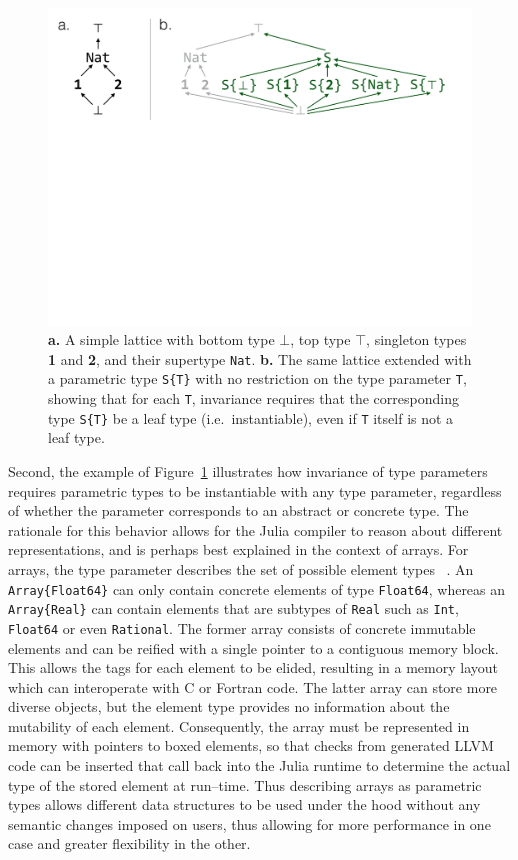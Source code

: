 \documentclass[pldi]{sigplanconf-pldi15}
\begin{document}
\begin{figure}
	\centering
	\includegraphics[width=\columnwidth]{fig-lattice}
	\caption{
		\textbf{a.} A simple lattice with bottom type $\bot$, top type
		$\top$, singleton types \textbf{1} and \textbf{2}, and their
		supertype \texttt{Nat}.
		\textbf{b.} The same lattice extended with a parametric type
		\texttt{S\{T\}} with no restriction on the type parameter
		\texttt{T}, showing that for each \texttt{T}, invariance
		requires that the corresponding type \texttt{S\{T\}} be a leaf
		type (i.e.\ instantiable), even if \texttt{T} itself is not a
		leaf type.}
	\label{fig:lattice}
\end{figure}

Second, the example of Figure~\ref{fig:lattice} illustrates how invariance of
type parameters requires parametric types to be instantiable with any type
parameter, regardless of whether the parameter corresponds to an abstract or
concrete type. The rationale for this behavior allows for the Julia compiler to
reason about different representations, and is perhaps best explained in the
context of arrays. For arrays, the type parameter describes the set of possible
element types ~\cite{Bezanson2014}.  An \verb|Array{Float64}|
can only contain concrete elements of type \verb|Float64|, whereas an
\verb|Array{Real}| can contain elements that are subtypes of \verb|Real| such
as \verb|Int|, \verb|Float64| or even \verb|Rational|. The former array
consists of concrete immutable elements and can be reified with a single
pointer to a contiguous memory block.  This allows the tags for each element to be elided,
resulting in a memory layout which can interoperate with C or Fortran code.
The latter array can store more diverse objects,
but the element type provides no information about the mutability of each
element. Consequently, the array must be represented in memory with pointers to
boxed elements, so that checks from generated LLVM code can be inserted that
call back into the Julia runtime to determine the actual type of the stored
element at run--time. Thus describing arrays as parametric types allows
different data structures to be used under the hood without any semantic
changes imposed on users, thus allowing for more performance in one case and
greater flexibility in the other.
\end{document}
